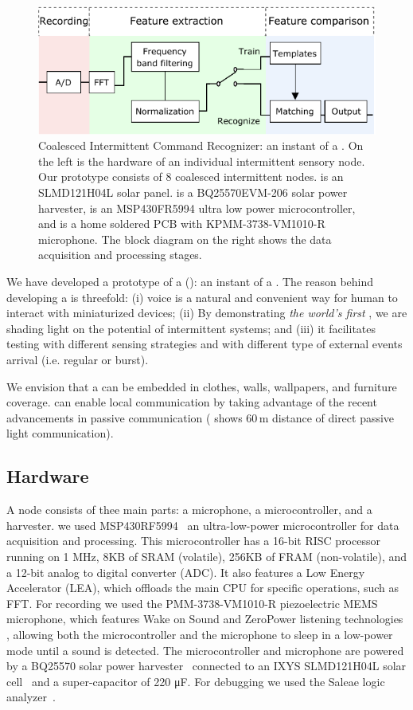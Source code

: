 \begin{figure}
	\centering
	\includegraphics[width=\columnwidth]{figures/cis}
	\caption{Coalesced Intermittent Command Recognizer: an instant of a \fullsys. On the left is the hardware of an individual intermittent sensory node. Our prototype consists of 8 coalesced intermittent nodes.  is an SLMD121H04L solar panel.  is a BQ25570EVM-206 solar power harvester,  is an MSP430FR5994 ultra low power microcontroller, and  is a home soldered PCB with KPMM-3738-VM1010-R microphone. The block diagram on the right shows the data acquisition and processing stages.}
	\label{fig:powerCycle}
\end{figure}

We have developed a prototype of a \fullcim (\cim): an instant of a \fullsys. The reason behind developing a \cim is threefold: (i) voice is a natural and convenient way for human to interact with miniaturized devices; (ii) By demonstrating \textit{the world's first} \fullcim, we are shading light on the potential of intermittent systems; and (iii) it facilitates testing with different sensing strategies and with different type of external events arrival (i.e. regular  or burst). 

We envision that a \cim can be embedded in clothes, walls, wallpapers, and furniture coverage. \cim can enable local communication by taking advantage of the recent advancements in passive communication (\cite{marco} shows 60\,m distance of direct passive light communication). 

\subsection{Hardware}
A \cim node consists of thee main parts: a microphone, a microcontroller, and a harvester. we used MSP430RF5994~\cite{ti_msp430_website} an ultra-low-power microcontroller for data acquisition and processing. This microcontroller has a 16-bit RISC processor running on 1 MHz, 8KB of SRAM (volatile), 256KB of FRAM (non-volatile), and a 12-bit analog to digital converter (ADC). It also features a Low Energy Accelerator (LEA), which offloads the main CPU for specific operations, such as FFT. For recording we used the PMM-3738-VM1010-R piezoelectric MEMS microphone, which features Wake on Sound and ZeroPower listening technologies \cite{microphone}, allowing both the microcontroller and the microphone to sleep in a low-power mode until a sound is detected.
The microcontroller and microphone are powered by a BQ25570 solar power harvester~\cite{BQ25570EVM-206_website} connected to an IXYS SLMD121H04L solar cell~\cite{SLMD121H04L_website} and a super-capacitor of 220 \si{\micro F}. For debugging we used the Saleae logic analyzer~\cite{saleae}.

